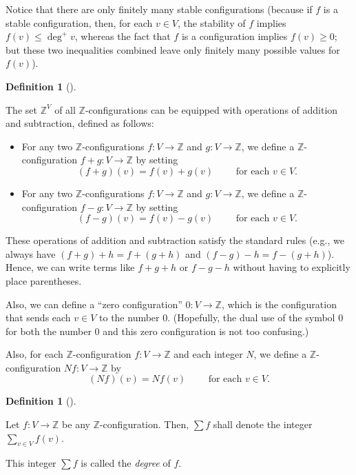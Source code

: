 \documentclass[numbers=enddot,12pt,final,onecolumn,notitlepage]{scrartcl}%
\theoremstyle{definition}
\newtheorem{defi}[theo]{Definition}
\newenvironment{definition}[1][]
{\begin{defi}[#1]\begin{leftbar}}
{\end{leftbar}\end{defi}}
\let\sumnonlimits\sum
\renewcommand{\sum}{\sumnonlimits\limits}
\newcommand{\ZZ}{\mathbb{Z}}
\newcommand{\tup}[1]{\left( #1 \right)}
\begin{document}
Notice that there are only finitely many stable configurations
(because if $f$ is a stable configuration, then, for each
$v \in V$, the stability of $f$ implies $f \tup{v} \leq \deg^+ v$,
whereas the fact that $f$ is a configuration implies
$f \tup{v} \geq 0$; but these two inequalities combined
leave only finitely many possible values for $f \tup{v}$).

\begin{definition} \label{def.chip.add-configs}
The set $\ZZ^V$ of all $\ZZ$-configurations can be equipped with
operations of addition and subtraction, defined as follows:

\begin{itemize}
 \item For any two $\ZZ$-configurations $f : V \to \ZZ$ and
       $g : V \to \ZZ$, we define a $\ZZ$-configuration
       $f + g : V \to \ZZ$ by setting
       \[
        \tup{f + g} \tup{v}
        = f \tup{v} + g \tup{v}
        \qquad \text{ for each } v \in V .
       \]

 \item For any two $\ZZ$-configurations $f : V \to \ZZ$ and
       $g : V \to \ZZ$, we define a $\ZZ$-configuration
       $f - g : V \to \ZZ$ by setting
       \[
        \tup{f - g} \tup{v}
        = f \tup{v} - g \tup{v}
        \qquad \text{ for each } v \in V .
       \]
\end{itemize}

These operations of addition and subtraction satisfy the
standard rules (e.g., we always have
$\tup{f+g} + h = f + \tup{g+h}$ and
$\tup{f-g} - h = f - \tup{g+h}$).
Hence, we can write terms like $f + g + h$ or $f - g - h$
without having to explicitly place parentheses.

Also, we can define a ``zero configuration'' $0 : V \to \ZZ$,
which is the configuration that sends each $v \in V$ to the
number $0$.
(Hopefully, the dual use of the symbol $0$ for both the number
$0$ and this zero configuration is not too confusing.)

Also, for each $\ZZ$-configuration $f : V \to \ZZ$ and each
integer $N$, we define a $\ZZ$-configuration $Nf : V \to \ZZ$
by
\[
\tup{Nf} \tup{v} = N f \tup{v}
\qquad \text{ for each } v \in V .
\]
\end{definition}

\begin{definition}
Let $f : V \to \ZZ$ be any $\ZZ$-configuration.
Then, $\sum f$ shall denote the integer
$\sum_{v \in V} f \tup{v}$.

This integer $\sum f$ is called the \textit{degree} of $f$.
\end{definition}
\end{document}
